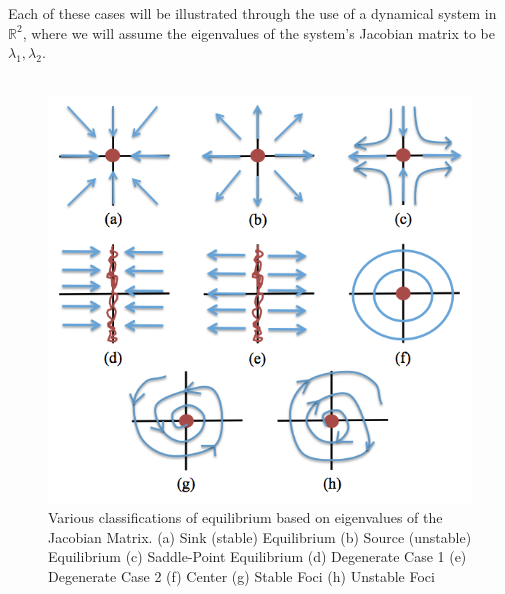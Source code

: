 \noindent Each of these cases will be illustrated through the use of a dynamical system in $\mathbb{R}^2$, where we will assume the eigenvalues of the system's Jacobian matrix to be ${\lambda_1, \lambda_2}.$ \\

$ $\\

\begin{figure}[h!]
\centering
\includegraphics[width=5.0in]{EquilibriaClassification.png}
\caption{Various classifications of equilibrium based on eigenvalues of the Jacobian Matrix. (a) Sink (stable) Equilibrium (b) Source (unstable) Equilibrium (c) Saddle-Point Equilibrium (d) Degenerate Case 1 (e) Degenerate Case 2 (f) Center (g) Stable Foci (h) Unstable Foci}
\label{EquilibriaClassification}
\end{figure}

